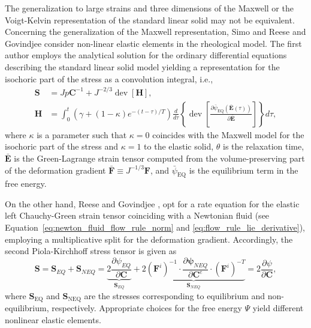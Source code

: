 The generalization to large strains and three dimensions of the Maxwell or the Voigt-Kelvin representation of the standard linear solid may not be equivalent.
Concerning the generalization of the Maxwell representation, Simo \citep{simoFullyThreedimensionalFinitestrain1987} and Reese and Govindjee \citep{reeseTheoryFiniteViscoelasticity1998} consider non-linear elastic elements in the rheological model.
The first author employs the analytical solution for the ordinary differential equations describing the standard linear solid model yielding a representation for the isochoric part of the stress as a convolution integral, i.e.,
\begin{align}
	\mathbf S &= Jp\mathbf C^{-1} + J^{-2/3}\operatorname{dev}[\mathbf H],\\
	\mathbf H &= \int_0^t (\gamma + (1-\kappa)e^{-(t-\tau)/T}) \frac{d}{d\tau}\left\{\operatorname{dev} \left[\frac{\partial {\bar\psi}_\text{EQ}(\bar{\mathbf E}(\tau))}{\partial \bar{\mathbf E}}\right]\right\}  d\tau,
\end{align}
where $\kappa$ is a parameter such that $\kappa=0$ coincides with the Maxwell model for the isochoric part of the stress and $\kappa=1$ to the elastic solid, $\theta$ is the relaxation time, $\bar{\bm E}$ is the Green-Lagrange strain tensor computed from the volume-preserving part of the deformation gradient $\bar{\bm F} \equiv J^{-1/3} \bm F$, and $\bar{\psi	}_\text{EQ}$ is the equilibrium term in the free energy.

On the other hand, Reese and Govindjee \citep{reeseTheoryFiniteViscoelasticity1998}, opt for a rate equation for the elastic left Chauchy-Green strain tensor coinciding with a Newtonian fluid (see Equation~\eqref{eq:newton_fluid_flow_rule_norm} and \eqref{eq:flow_rule_lie_derivative}), employing a multiplicative split for the deformation gradient.
Accordingly, the second Piola-Kirchhoff stress tensor is given as
\begin{equation}
	\mathbf{S}=\mathbf{S}_{E Q}+\mathbf{S}_{N E Q}=\underbrace{2 \frac{\partial \psi_{E Q}}{\partial \mathbf{C}}}_{\mathbf{S}_{E Q}}+\underbrace{2 (\mathbf{F}^i)^{-1} \cdot \frac{\partial \mathbf{\psi}_{N E Q}}{\partial \mathbf{C}^e} \cdot (\mathbf{F}^i)^{-T}}_{\mathbf{S}_{N E Q}}=2 \frac{\partial \psi}{\partial \mathbf{C}},
\end{equation}
where $\mathbf S_\text{EQ}$ and $\mathbf S_\text{NEQ}$ are the stresses corresponding to equilibrium and non-equilibrium, respectively.
Appropriate choices for the free energy $\Psi$ yield different nonlinear elastic elements.

